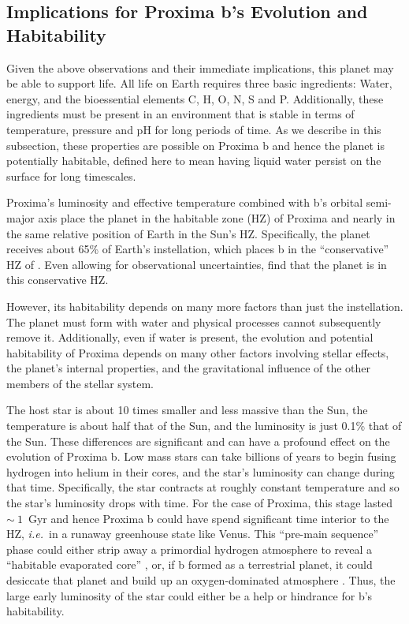 \documentclass[preprint,12pt]{aastex}
\def\ie{{\it i.e.\ }}
\begin{document}
\subsection{Implications for Proxima b's Evolution and Habitability}
\label{sec:obs:imp}

Given the above observations and their immediate implications, this
planet may be able to support life. All life on Earth requires three
basic ingredients: Water, energy, and the bioessential elements C,
H, O, N, S and P. Additionally, these ingredients must be present in an
environment that is stable in terms of temperature, pressure and pH
for long periods of time. As we describe in this subsection, these
properties are possible on Proxima b and hence the planet is
potentially habitable, defined here to mean having liquid water persist on
the surface for long timescales.

Proxima's luminosity and effective temperature combined with b's
orbital semi-major axis place the planet in the habitable zone (HZ) of
Proxima and nearly in the same relative position of Earth in the Sun's
HZ. Specifically, the planet receives about 65\% of Earth's
instellation, which places b in the ``conservative'' HZ of
\cite{Kopparapu13}. Even allowing for observational uncertainties,
\cite{AngladaEscude16} find that the planet is in this conservative
HZ.

However, its habitability depends on many more factors than just the
instellation. The planet must form with water and physical processes
cannot subsequently remove it. Additionally, even if water is present,
the evolution and potential habitability of Proxima depends on many
other factors involving stellar effects, the planet's internal
properties, and the gravitational influence of the other members of
the stellar system.

The host star is about 10 times smaller and less massive than the Sun,
the temperature is about half that of the Sun, and the luminosity is
just 0.1\% that of the Sun. These differences are significant and can
have a profound effect on the evolution of Proxima b. Low mass stars
can take billions of years to begin fusing hydrogen into helium in
their cores, and the star's luminosity can change during that
time. Specifically, the star contracts at roughly constant temperature and so
the star's luminosity drops with time. For the case of Proxima, this
stage lasted $\sim~1$~Gyr \citep{Baraffe15} and hence Proxima b
could have spend significant time interior to the HZ, \ie in a runaway
greenhouse state like Venus. This ``pre-main sequence'' phase could
either strip away a primordial hydrogen atmosphere to reveal a
``habitable evaporated core'' \citep{Luger15}, or, if b formed as a
terrestrial planet, it could desiccate that planet and build up an
oxygen-dominated atmosphere \citep{LugerBarnes15}. Thus, the large
early luminosity of the star could either be a help or hindrance for
b's habitability.
\end{document}
